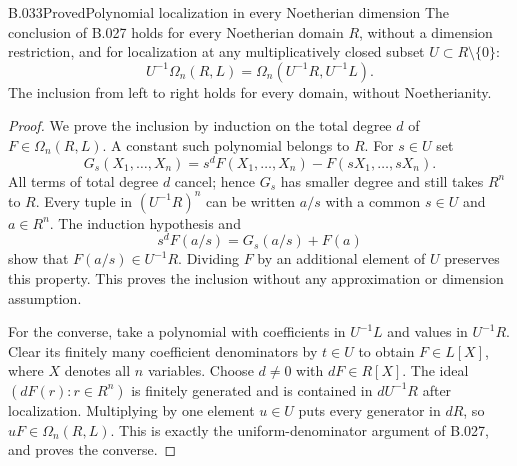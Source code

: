 \begin{saresult}{B.033}{Proved}{Polynomial localization in every Noetherian dimension}
The conclusion of B.027 holds for every Noetherian domain $R$,
without a dimension restriction, and for localization at any
multiplicatively closed subset $U\subset R\setminus\{0\}$:
\[
 U^{-1}\Omega_n(R,L)=\Omega_n(U^{-1}R,U^{-1}L).
\]
The inclusion from left to right holds for every domain, without
Noetherianity.
\end{saresult}
\begin{proof}
We prove the inclusion by induction on the total degree $d$ of
$F\in\Omega_n(R,L)$. A constant such polynomial belongs to $R$.
For $s\in U$ set
\[
 G_s(X_1,\ldots,X_n)
   =s^dF(X_1,\ldots,X_n)-F(sX_1,\ldots,sX_n).
\]
All terms of total degree $d$ cancel; hence $G_s$ has smaller
degree and still takes $R^n$ to $R$. Every tuple in $(U^{-1}R)^n$
can be written $a/s$ with a common $s\in U$ and $a\in R^n$.
The induction hypothesis and
\[
 s^dF(a/s)=G_s(a/s)+F(a)
\]
show that $F(a/s)\in U^{-1}R$. Dividing $F$ by an additional
element of $U$ preserves this property. This proves the inclusion
without any approximation or dimension assumption.

For the converse, take a polynomial with coefficients in
$U^{-1}L$ and values in $U^{-1}R$. Clear its finitely many
coefficient denominators by $t\in U$ to obtain $F\in L[X]$,
where $X$ denotes all $n$ variables. Choose $d\ne0$ with
$dF\in R[X]$. The ideal $(dF(r):r\in R^n)$ is finitely generated
and is contained in $dU^{-1}R$ after localization.
Multiplying by one element $u\in U$ puts every generator in $dR$,
so $uF\in\Omega_n(R,L)$. This is exactly the uniform-denominator
argument of B.027, and proves the converse.
\end{proof}

